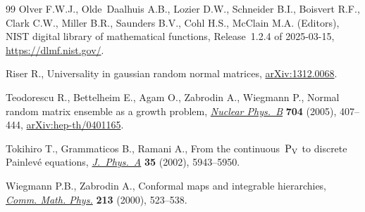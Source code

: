 \documentclass[10pt,a4paper]{amsart}
\numberwithin{equation}{section}
\theoremstyle{definition}
\begin{document}
\begin{thebibliography}{99}
Olver F.W.J., Olde~Daalhuis A.B., Lozier D.W., Schneider B.I., Boisvert R.F.,
 Clark C.W., Miller B.R., Saunders B.V., Cohl H.S., McClain M.A. (Editors), {NIST}
 digital library of mathematical functions, {R}elease~1.2.4 of 2025-03-15,
 \url{https://dlmf.nist.gov/}.

Riser R., Universality in gaussian random normal matrices,
 \href{http://arxiv.org/abs/1312.0068}{arXiv:1312.0068}.

Teodorescu R., Bettelheim E., Agam O., Zabrodin A., Wiegmann P., Normal random
 matrix ensemble as a growth problem,
 \href{https://doi.org/10.1016/j.nuclphysb.2004.10.006}{\textit{Nuclear
 Phys.~B}} \textbf{704} (2005), 407--444,
 \href{http://arxiv.org/abs/hep-th/0401165}{arXiv:hep-th/0401165}.

Tokihiro T., Grammaticos B., Ramani A., From the continuous~{$\rm P_V$} to
 discrete {P}ainlev\'e equations,
 \href{https://doi.org/10.1088/0305-4470/35/28/312}{\textit{J.~Phys.~A}}
 \textbf{35} (2002), 5943--5950.

Wiegmann P.B., Zabrodin A., Conformal maps and integrable hierarchies,
 \href{https://doi.org/10.1007/s002200000249}{\textit{Comm. Math. Phys.}}
 \textbf{213} (2000), 523--538.

\end{thebibliography}
\end{document}
